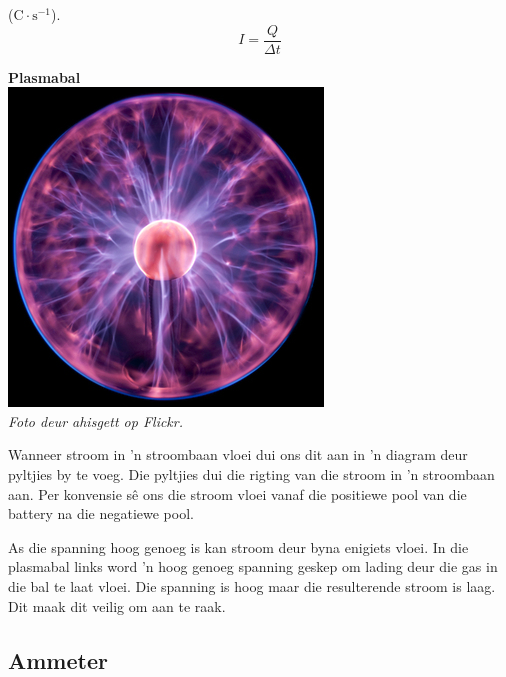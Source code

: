 ($\text{C} \cdot \text{s}^{-1}$).
\begin{equation*}
\boxed{I = \frac{Q}{\Delta t}}
\end{equation*}
\begin{minipage}{.5\textwidth}
\begin{center}
\textbf{Plasmabal}\\
\includegraphics[width=.8\textwidth]{photos/plasmaball_by_ahisgett.jpg}\\
\textit{Foto deur ahisgett op Flickr.}
\end{center}   
\end{minipage}
\begin{minipage}{.5\textwidth}

Wanneer stroom in 'n stroombaan vloei dui ons dit aan in 'n diagram deur
pyltjies by te voeg. Die pyltjies dui die rigting van die
stroom in 'n stroombaan aan. Per konvensie s\^e ons die stroom vloei vanaf die
positiewe pool van die battery na die negatiewe pool.

As die spanning hoog genoeg is kan stroom deur byna enigiets vloei. In die
plasmabal links word 'n hoog genoeg spanning geskep om lading deur die gas in
die bal te laat vloei. Die spanning is hoog maar die resulterende stroom is
laag. Dit maak dit veilig om aan te raak.
\end{minipage}


\subsection*{Ammeter}

